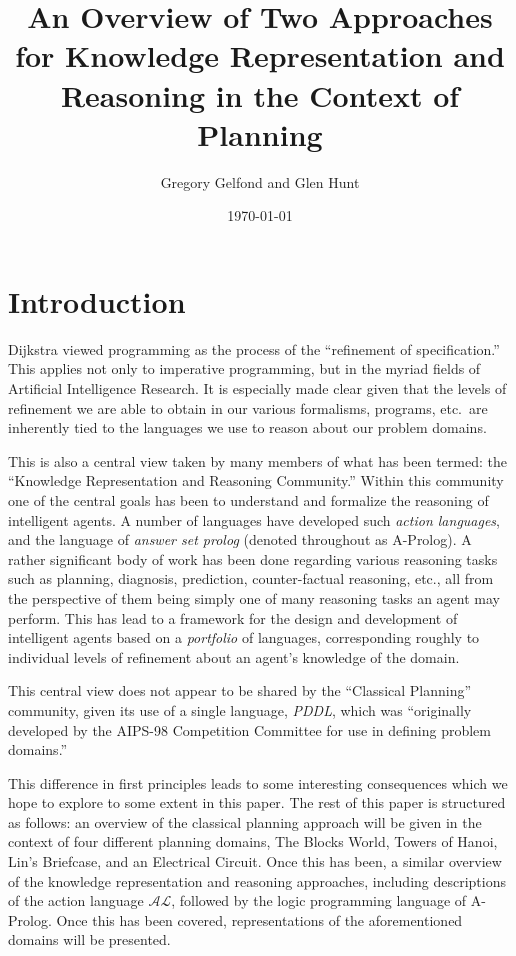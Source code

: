 \documentclass{article}
\title{An Overview of Two Approaches for Knowledge Representation and Reasoning in the Context of Planning}
\author{Gregory Gelfond and Glen Hunt}
\date{\today}
\newcommand{\AL}{\ensuremath{\mathcal{AL}}}
\begin{document}
\maketitle

\section{Introduction}

Dijkstra viewed programming as the process of the ``refinement of specification.'' This applies not only to imperative programming, but in the myriad fields of Artificial Intelligence Research. It is especially made clear given that the levels of refinement we are able to obtain in our various formalisms, programs, etc.\, are inherently tied to the languages we use to reason about our problem domains.

This is also a central view taken by many members of what has been termed: the ``Knowledge Representation and Reasoning Community.'' Within this community one of the central goals has been to understand and formalize the reasoning of intelligent agents. A number of languages have developed such \emph{action languages}, and the language of \emph{answer set prolog} (denoted throughout as A-Prolog). A rather significant body of work has been done regarding various reasoning tasks such as planning, diagnosis, prediction, counter-factual reasoning, etc., all from the perspective of them being simply one of many reasoning tasks an agent may perform. This has lead to a framework for the design and development of intelligent agents based on a \emph{portfolio} of languages, corresponding roughly to individual levels of refinement about an agent's knowledge of the domain.

This central view does not appear to be shared by the ``Classical Planning'' community, given its use of a single language, \emph{PDDL}, which was ``originally developed by the AIPS-98 Competition Committee for use in defining problem domains.''

This difference in first principles leads to some interesting consequences which we hope to explore to some extent in this paper. The rest of this paper is structured as follows: an overview of the classical planning approach will be given in the context of four different planning domains, The Blocks World, Towers of Hanoi, Lin's Briefcase, and an Electrical Circuit. Once this has been, a similar overview of the knowledge representation and reasoning approaches, including descriptions of the action language $\AL$, followed by the logic programming language of A-Prolog. Once this has been covered, representations of the aforementioned domains will be presented.
\end{document}
